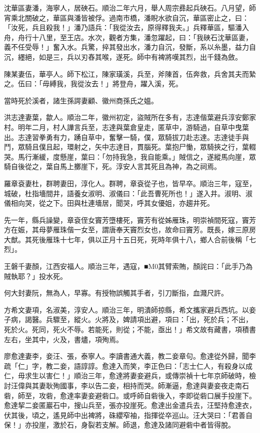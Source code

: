 \begin{pinyinscope}
沈華區妻潘，海寧人，居硤石。順治二年六月，舉人周宗彞起兵硤石。八月望，師宵乘北關破之，華區與潘皆被俘。過南市橋，潘睨水欲自沉，華區密止之，曰：「汝死，兵且殺我！」潘乃語兵：「我從汝去，原得釋我夫。」兵釋華區，驅潘入舟，舟行十八里，至王店。水次，觀者方集，潘忽躍起，曰：「我硤石沈華區妻，義不任受辱！」奮入水。兵驚，捽其發出水，潘力自沉，發斷，系以糸墨，益力自沉，纆絕，如是三，兵以刃舂其喉，遂死。師中有裨將嘆其烈，出千錢為斂。

陳某妻伍，華亭人。師下松江，陳家璜溪，兵至，斧陳首，伍奔救，兵舍其夫而縶之。伍曰：「毋縛我，我從汝去！」將登舟，躍入溪，死。

當時死於溪者，諸生孫諤妻顧、徽州商孫氏之媼。

洪志達妻葉，歙人。順治二年，徽州初定，盜賊所在多有，志達偕葉避兵淳安鄭家村。明年二月，村人譁言兵至，志達與葉倉皇走，匿草中，游騎過，自草中曳葉出。志達習拳勇有力，踴自草中，奮擊一騎，僕，眾騎拔刀赴志達。志達徒手與鬥，眾騎且僕且起，環射之，矢中志達目，貫腦死。葉抱尸慟，眾騎挾之行，葉輟哭。馬行漸緩，度懸崖，葉曰：「勿持我急，我自能乘。」賊信之，遂縱馬向崖，眾騎自後從之，葉自馬上擲崖下，死。淳安人言其死且為神，為之祠焉。

羅章袞妻杜，群聘妻田，淳化人。群聘，章袞從子也，皆早卒。順治三年，寇至，城破，杜指墻間井，語養女淑明、淑儀曰：「此吾曹死所也！」遂入井。淑明、淑儀相向哭，從之下。田與杜連墻居，聞哭，呼其女優姐，亦趨井死。

先一年，縣兵譟變，章袞侄女竇芳墮樓死，竇芳有從姊雁珠，明崇禎間死寇，竇芳方在娠，其母夢雁珠偕一女至，謂唐奉天竇烈女也，故命曰竇芳。既長，嫁三原房大猷。其死後雁珠十七年，俱以正月十五日死，死時年俱十八，鄉人合前後稱「七烈」。

王磐千妻顏，江西安福人。順治三年，遇寇，■M0其臂索賄，顏詫曰：「此手乃為賊執耶？」投水死。

何大封妻阮，無為人，早寡。有授物誤觸其手者，引刀斷指，血濺尺許。

方希文妻項，名淑美，淳安人。順治三年，明潰師掠縣，希文攜家避兵西坑。以妾子病，謁醫。兵驟至，縱火。火將及，婢請項出避，項曰：「出，死於兵；不出，死於火。死同，死火不辱。若能死，則從；不能，亟出！」希文故有藏書，項積書左右，坐其中，火及，書燼，項殉焉。

廖愈達妻李，妾汪、張，泰寧人。李讀書通大義，教二妾章句。愈達從外歸，聞李疏「仁」字，教二妾，語諄諄。愈達入而笑，李正色曰：「志士仁人，有殺身以成仁，毋求生以害仁！」順治三年，愈達將妻妾避兵，或傳崇禎十七年京師破時，檢討汪偉與其妻耿殉國事，李以告二妾，相持而哭。師漸逼，愈達與妻妾夜走南石砦，師至，攻砦，愈達率妻妾避砦口。或呼師自砦後入，李即從砦口展手投崖下。愈達挈二妾匿巖石中，搜山兵至，張亦投崖死。愈達出金遣兵去，汪堅持愈達衣，伏其後，頃之，遙見師中出裨將，硃纓窄袖，指揮從卒巡山。汪大哭曰：「君善自保！」亦投崖，激於石，身裂若支解。師退，愈達及諸同避砦中者皆得脫。


\end{pinyinscope}
